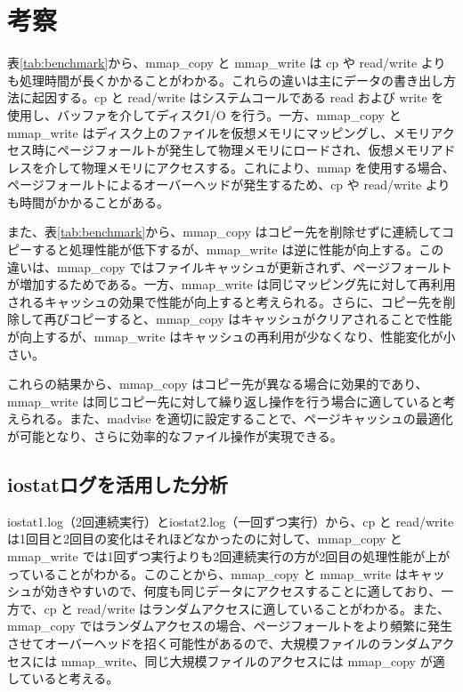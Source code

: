 \documentclass[a4paper, 11pt, titlepage]{jsarticle}
\begin{document}
\section{考察}

表\ref{tab:benchmark}から、mmap\_copy と mmap\_write は cp や read/write よりも処理時間が長くかかることがわかる。これらの違いは主にデータの書き出し方法に起因する。cp と read/write はシステムコールである read および write を使用し、バッファを介してディスクI/O を行う。一方、mmap\_copy と mmap\_write はディスク上のファイルを仮想メモリにマッピングし、メモリアクセス時にページフォールトが発生して物理メモリにロードされ、仮想メモリアドレスを介して物理メモリにアクセスする。これにより、mmap を使用する場合、ページフォールトによるオーバーヘッドが発生するため、cp や read/write よりも時間がかかることがある。

また、表\ref{tab:benchmark}から、mmap\_copy はコピー先を削除せずに連続してコピーすると処理性能が低下するが、mmap\_write は逆に性能が向上する。この違いは、mmap\_copy ではファイルキャッシュが更新されず、ページフォールトが増加するためである。一方、mmap\_write は同じマッピング先に対して再利用されるキャッシュの効果で性能が向上すると考えられる。さらに、コピー先を削除して再びコピーすると、mmap\_copy はキャッシュがクリアされることで性能が向上するが、mmap\_write はキャッシュの再利用が少なくなり、性能変化が小さい。

これらの結果から、mmap\_copy はコピー先が異なる場合に効果的であり、mmap\_write は同じコピー先に対して繰り返し操作を行う場合に適していると考えられる。また、madvise を適切に設定することで、ページキャッシュの最適化が可能となり、さらに効率的なファイル操作が実現できる。

\subsection{iostatログを活用した分析}

iostat1.log（2回連続実行）とiostat2.log（一回ずつ実行）から、cp と read/write は1回目と2回目の変化はそれほどなかったのに対して、mmap\_copy と mmap\_write では1回ずつ実行よりも2回連続実行の方が2回目の処理性能が上がっていることがわかる。このことから、mmap\_copy と mmap\_write はキャッシュが効きやすいので、何度も同じデータにアクセスすることに適しており、一方で、cp と read/write はランダムアクセスに適していることがわかる。また、mmap\_copy ではランダムアクセスの場合、ページフォールトをより頻繁に発生させてオーバーヘッドを招く可能性があるので、大規模ファイルのランダムアクセスには mmap\_write、同じ大規模ファイルのアクセスには mmap\_copy が適していると考える。
\end{document}
